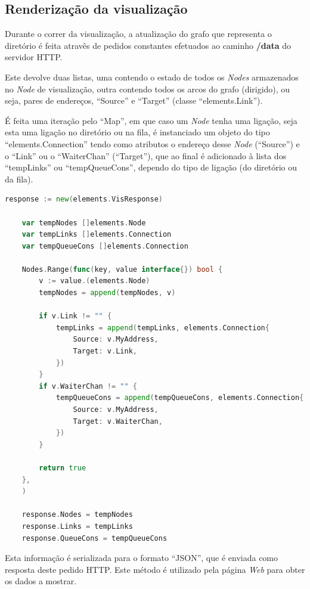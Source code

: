 \subsection*{Renderização da visualização}

Durante o correr da visualização, a atualização do grafo que representa o diretório é feita atravês de 
pedidos constantes efetuados ao caminho \textbf{/data} do servidor \acs{HTTP}.

Este devolve duas listas, uma contendo o estado de todos os \emph{Nodes} armazenados no \emph{Node} de visualização, 
outra contendo todos os arcos do grafo (dirigido), ou seja, pares de endereços, ``Source'' e ``Target'' 
(classe ``elements.Link''). 

É feita uma iteração pelo ``Map'', em que caso um \emph{Node} tenha uma ligação, seja esta uma ligação no diretório ou na fila, é instanciado 
um objeto do tipo 
``elements.Connection'' tendo como atributos o endereço desse \emph{Node} (``Source'') e o ``Link'' ou o ``WaiterChan'' (``Target''), que ao final é 
adicionado à lista dos ``tempLinks'' ou ``tempQueueCons'', dependo do tipo de ligação (do diretório ou da fila).


\begin{lstlisting}[caption={Iteração pelo ``Map'' ``Nodes'', instanciação do objeto e adicionado à lista },language=Go]
	response := new(elements.VisResponse)

	var tempNodes []elements.Node
	var tempLinks []elements.Connection
	var tempQueueCons []elements.Connection

	Nodes.Range(func(key, value interface{}) bool {
		v := value.(elements.Node)
		tempNodes = append(tempNodes, v)

		if v.Link != "" {
			tempLinks = append(tempLinks, elements.Connection{
				Source: v.MyAddress,
				Target: v.Link,
			})
		}
		if v.WaiterChan != "" {
			tempQueueCons = append(tempQueueCons, elements.Connection{
				Source: v.MyAddress,
				Target: v.WaiterChan,
			})
		}

		return true
	},
	)

	response.Nodes = tempNodes
	response.Links = tempLinks
	response.QueueCons = tempQueueCons

\end{lstlisting}

Esta informação é serializada para o formato ``JSON'', que é enviada como resposta deste pedido \acs{HTTP}.
Este método é utilizado pela página \emph{Web} para obter os dados a mostrar.

